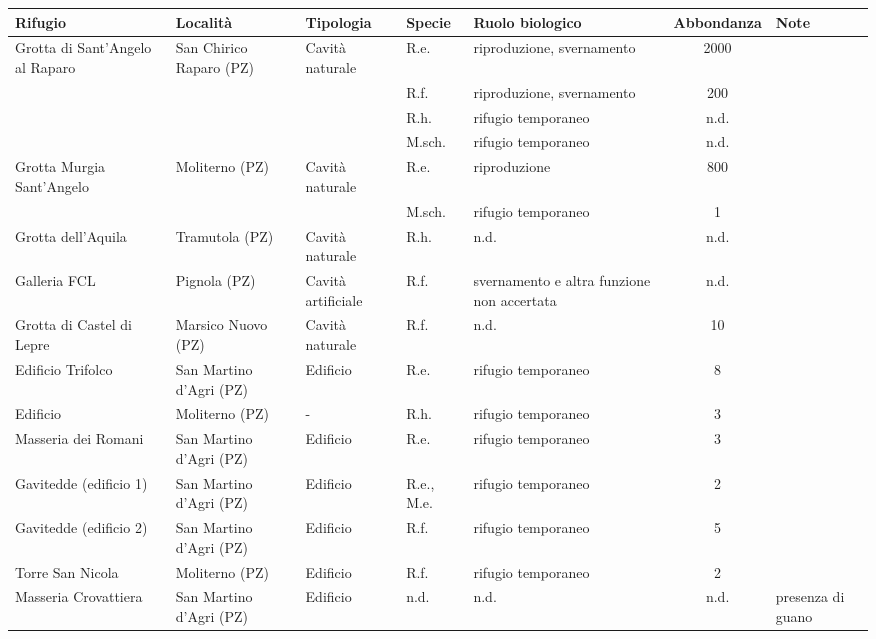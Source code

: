 \begin{multicols}{2}
\begin{table}[t]
\centering\small
\begin{tabular}{p{25mm}p{30mm}llp{30mm}cp{15mm}}
\textbf{Rifugio} & \textbf{Località} & \textbf{Tipologia} & \textbf{Specie} & \textbf{Ruolo biologico} & \textbf{Abbondanza} & \textbf{Note} \\
\hline
Grotta di Sant’Angelo al Raparo & San Chirico Raparo (PZ) &	Cavità naturale &	R.e. & riproduzione, svernamento & 2000 & \\	
& & & R.f. & riproduzione, svernamento & 200	 & \\
& & & R.h. & rifugio  temporaneo & n.d. & \\	
& & & M.sch. & rifugio  temporaneo & n.d. \\
Grotta Murgia Sant’Angelo & Moliterno (PZ) & Cavità naturale & R.e. & riproduzione & 800 & \\	
& & & M.sch. & rifugio temporaneo & 1 & \\	
Grotta dell’Aquila & Tramutola (PZ) & Cavità naturale & R.h. & n.d. & n.d. & \\
Galleria FCL & Pignola (PZ) & Cavità artificiale & R.f. & svernamento e altra funzione non accertata & n.d. & \\
Grotta di Castel di Lepre & Marsico Nuovo (PZ) & Cavità naturale & R.f. & n.d. & 10 & \\
Edificio Trifolco & San Martino d’Agri (PZ) & Edificio & R.e. & rifugio temporaneo & 8 & \\	
Edificio & Moliterno (PZ) & - & R.h. & rifugio temporaneo & 3 & \\	
Masseria dei Romani & San Martino d’Agri (PZ) & Edificio & R.e. & rifugio temporaneo & 3 & \\	
Gavitedde (edificio 1) & San Martino d’Agri (PZ) & Edificio & R.e., M.e. & rifugio temporaneo & 2 & \\	
Gavitedde (edificio 2) & San Martino d’Agri (PZ) & Edificio & R.f. & rifugio temporaneo & 5 & \\	
Torre San Nicola & Moliterno (PZ) & Edificio & R.f. & rifugio temporaneo & 2 & \\	
Masseria Crovattiera & San Martino d’Agri (PZ) & Edificio & n.d. & n.d. & n.d. & presenza di guano \\
\end{tabular}
\end{table}


\end{multicols}
